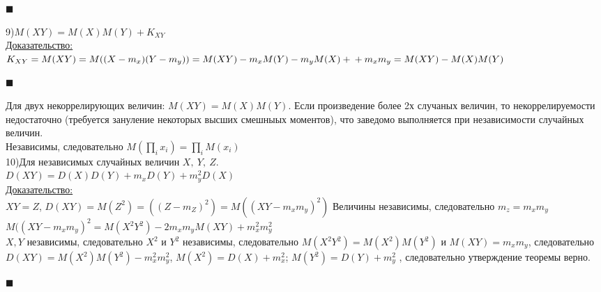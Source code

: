 \documentclass[russian, 12pt, fleqn]{article}
\begin{document}
\begin{flushright}\(\blacksquare\)\end{flushright}
9)$M(XY)=M(X)M(Y)+K_{XY}$\\
\underline{Доказательство:}\\
$K_{XY} = M(XY) = M((X-m_x)(Y-m_y)) = M(XY)  - m_xM(Y) - m_y M(X) +\\+ m_xm_y  = M(XY) - M(X)M(Y)$
\begin{flushright}\(\blacksquare\)\end{flushright}
Для двух некоррелирующих величин: $M(XY) = M(X)M(Y)$. Если произведение более 2х случаных величин, то некоррелируемости недостаточно (требуется зануление некоторых высших смешныых моментов), что заведомо выполняется при независимости случайных величин.\\
Независимы, следовательно $\displaystyle{ M(\prod_{i}x_i) = \prod_{i} M(x_i)}$\\
10)Для независимых случайных величин $X,\ Y,\ Z$.\\
$D(XY)=D(X)D(Y) + m_xD(Y) + m_y^2D(X)$ \\
\underline{Доказательство:}\\
$XY=Z$, $D(XY)=M(Z^2)=((Z-m_Z)^2) = M((XY-m_xm_y)^2)$
Величины независимы, следовательно $m_z=m_xm_y$\\
$M((XY-m_xm_y)^2 = M(X^2Y^2) - 2m_xm_y M(XY) + m_x^2 m_y^2$\\
$X, Y$ независимы, следовательно $X^2$ и $Y^2$ независимы, следовательно $M(X^2Y^2) =M(X^2)M(Y^2)$ и $M(XY) = m_x m_y$, следовательно \\
$D(XY) = M(X^2)M(Y^2) - m_x^2 m_y^2$, $M(X^2) = D(X) + m_x^2$; $M(Y^2) = D(Y) + m_y^2$ , следовательно утверждение теоремы верно.
\begin{flushright}\(\blacksquare\)\end{flushright}
\end{document}
